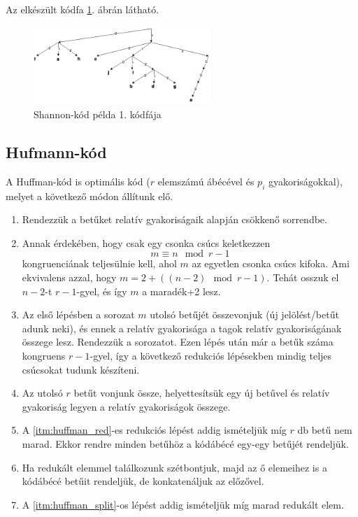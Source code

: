 \documentclass[12pt,margin=0px]{article}
\begin{document}
    \noindent Az elkészült kódfa \ref{fig:shannon}. ábrán látható.

    \begin{figure}[H]
        \centering
        \includegraphics[width=0.6\textwidth]{img/shannon.png}
        \caption{Shannon-kód példa 1. kódfája}
        \label{fig:shannon}
    \end{figure}

    \subsection*{Hufmann-kód}

    A Huffman-kód is optimális kód ($r$ elemszámú ábécével és $p_i$ gyakoriságokkal), melyet a következő módon állítunk elő.
    \begin{enumerate}
        \item Rendezzük a betűket relatív gyakoriságaik alapján csökkenő sorrendbe.
        \item Annak érdekében, hogy csak egy csonka csúcs keletkezzen
        \[m \equiv n \mod{r-1}\]
        kongruenciának teljesülnie kell, ahol $m$ az egyetlen csonka csúcs kifoka. Ami ekvivalens azzal, hogy $m = 2 + ((n-2) \mod{r-1})$. Tehát osszuk el $n-2$-t $r-1$-gyel, és így $m$ a maradék+2 lesz.
        \item Az első lépésben a sorozat $m$ utolsó betűjét összevonjuk (új jelölést/betűt adunk neki), és ennek a relatív gyakorisága a tagok relatív gyakoriságának összege lesz. Rendezzük a sorozatot. Ezen lépés után már a betűk száma kongruens $r-1$-gyel, így a következő redukciós lépésekben mindig teljes csúcsokat tudunk készíteni.
        \item \label{itm:huffman_red} Az utolsó $r$ betűt vonjunk össze, helyettesítsük egy új betűvel és relatív gyakoriság legyen a relatív gyakoriságok összege.
        \item A \ref{itm:huffman_red}-es redukciós lépést addig ismételjük míg $r$ db betű nem marad. Ekkor rendre minden betűhöz a kódábécé egy-egy betűjét rendeljük.
        \item \label{itm:huffman_split} Ha redukált elemmel találkozunk szétbontjuk, majd az ő elemeihez is a kódábécé betűit rendeljük, de konkatenáljuk az előzővel.
        \item A \ref{itm:huffman_split}-os lépést addig ismételjük míg marad redukált elem.\\
    \end{enumerate}
\end{document}
